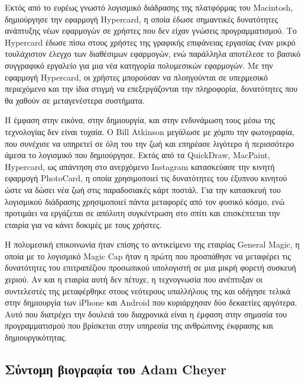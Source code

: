 \documentclass[
]{article}
\begin{document}
Εκτός από το ευρέως γνωστό λογισμικό διάδρασης της πλατφόρμας του
Macintosh, δημιούργησε την εφαρμογή Hypercard, η οποία έδωσε σημαντικές
δυνατότητες ανάπτυξης νέων εφαρμογών σε χρήστες που δεν είχαν γνώσεις
προγραμματισμού. Το Hypercard έδωσε πίσω στους χρήστες της γραφικής
επιφάνειας εργασίας έναν μικρό τουλάχιστον έλεγχο των διαθέσιμων
εφαρμογών, ενώ παράλληλα αποτέλεσε το βασικό συγγραφικό εργαλείο για μια
νέα κατηγορία πολυμεσικών εφαρμογών. Με την εφαρμογή Hypercard, οι
χρήστες μπορούσαν να πλοηγούνται σε υπερμεσικό περιεχόμενο και την ίδια
στιγμή να επεξεργάζονται την πληροφορία, δυνατότητες που θα χαθούν σε
μεταγενέστερα συστήματα.

Η έμφαση στην εικόνα, στην δημιουργία, και στην ενδυνάμωση τους μέσω της
τεχνολογίας δεν είναι τυχαία. Ο Bill Atkinson μεγάλωσε με χόμπυ την
φωτογραφία, που συνέχισε να υπηρετεί σε όλη του την ζωή και επηρέασε
λιγότερο ή περισσότερο άμεσα το λογισμικό που δημιούργησε. Εκτός από τα
QuickDraw, MacPaint, Hypercard, ως απάντηση στο ανερχόμενο Instagram
κατασκεύασε την κινητή εφαρμογή PhotoCard, η οποία χρησιμοποιεί τις
δυνατότητες του έξυπνου κινητού ώστε να δώσει νέα ζωή στις παραδοσιακές
κάρτ ποστάλ. Για την κατασκευή του λογισμικού διάδρασης χρησιμοποιεί
πάντα μεταφορές από τον φυσικό κόσμο, ενώ προτιμάει να εργάζεται σε
απόλυτη συγκέντρωση στο σπίτι και επισκέπτεται την εταιρία για να κάνει
δοκιμές με τους χρήστες.

Η πολυμεσική επικοινωνία ήταν επίσης το αντικείμενο της εταιρίας General
Magic, η οποία με το λογισμικό Magic Cap ήταν η πρώτη που προσπάθησε να
μεταφέρει τις δυνατότητες του επιτραπέζιου προσωπικού υπολογιστή σε μια
μικρή φορετή συσκευή χεριού. Αν και η εταιρία αυτή δεν πέτυχε, η
τεχνογνωσία που ανέπτυξαν οι συντελεστές της μεταφέρθηκε στους νεότερους
υπαλλήλους της και οδήγησε τελικά στην δημιουργία των iPhone και Android
που κυριάρχησαν δύο δεκαετίες αργότερα. Αυτό που διατρέχει την δουλειά
του διαχρονικά είναι η έμφαση στην σημασία του προγραμματισμού που
βρίσκεται στην υπηρεσία της ανθρώπινης έκφρασης και δημιουργικότητας.

\hypertarget{ux3c3ux3cdux3bdux3c4ux3bfux3bcux3b7-ux3b2ux3b9ux3bfux3b3ux3c1ux3b1ux3c6ux3afux3b1-ux3c4ux3bfux3c5-adam-cheyer}{%
\subsection{Σύντομη βιογραφία του Adam
Cheyer}\label{ux3c3ux3cdux3bdux3c4ux3bfux3bcux3b7-ux3b2ux3b9ux3bfux3b3ux3c1ux3b1ux3c6ux3afux3b1-ux3c4ux3bfux3c5-adam-cheyer}}
\end{document}
